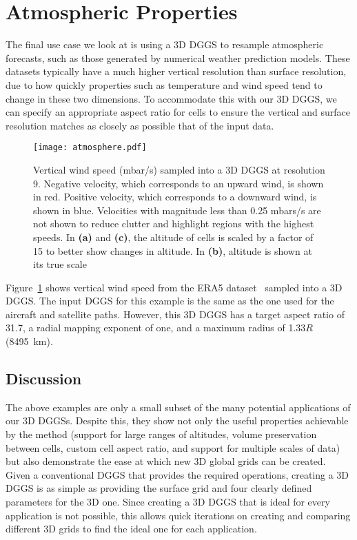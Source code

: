 \section{Atmospheric Properties}
The final use case we look at is using a 3D DGGS to resample atmospheric forecasts, such as those generated by numerical weather prediction models.
These datasets typically have a much higher vertical resolution than surface resolution, due to how quickly properties such as temperature and wind speed tend to change in these two dimensions.
To accommodate this with our 3D DGGS, we can specify an appropriate aspect ratio for cells to ensure the vertical and surface resolution matches as closely as possible that of the input data.


\begin{figure}[h]
	\centering
	\texttt{[image: atmosphere.pdf]}
	\caption{Vertical wind speed (mbar/s) sampled into a 3D DGGS at resolution 9.
		Negative velocity, which corresponds to an upward wind, is shown in red.
		Positive velocity, which corresponds to a downward wind, is shown in blue.
		Velocities with magnitude less than 0.25 mbars/s are not shown to reduce clutter and highlight regions with the highest speeds.
		In \textbf{(a)} and \textbf{(c)}, the altitude of cells is scaled by a factor of 15 to better show changes in altitude.
		In \textbf{(b)}, altitude is shown at its true scale}
	\label{fig:atmosphere}
\end{figure}


Figure~\ref{fig:atmosphere} shows vertical wind speed from the ERA5 dataset~\cite{era5} sampled into a 3D DGGS.
The input DGGS for this example is the same as the one used for the aircraft and satellite paths.
However, this 3D DGGS has a target aspect ratio of 31.7, a radial mapping exponent of one, and a maximum radius of 1.33$R$ (8495~km).


\subsection{Discussion}
The above examples are only a small subset of the many potential applications of our 3D DGGSs.
Despite this, they show not only the useful properties achievable by the method (support for large ranges of altitudes, volume preservation between cells, custom cell aspect ratio, and support for multiple scales of data) but also demonstrate the ease at which new 3D global grids can be created.
Given a conventional DGGS that provides the required operations, creating a 3D DGGS is as simple as providing the surface grid and four clearly defined parameters for the 3D one.
Since creating a 3D DGGS that is ideal for every application is not possible, this allows quick iterations on creating and comparing different 3D grids to find the ideal one for each application.